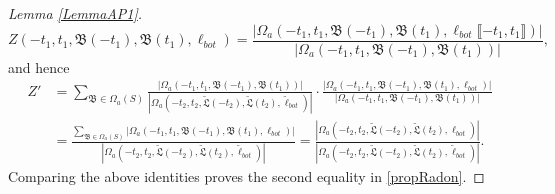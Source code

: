 \begin{proof}[Lemma \ref{LemmaAP1}]
\[	\]
	\[
	Z(-t_1,t_1,\mathfrak{B}(-t_1),\mathfrak{B}(t_1),\ell_{bot}) = \frac{|\Omega_a(-t_1,t_1,\mathfrak{B}(-t_1),\mathfrak{B}(t_1),\ell_{bot}\llbracket-t_1,t_1\rrbracket)|}{|\Omega_a(-t_1,t_1,\mathfrak{B}(-t_1),\mathfrak{B}(t_1))|},
	\]
	and hence
	\begin{equation*}
	\begin{split}
	Z' &=\sum_{\mathfrak{B}\in \Omega_a(S)}\frac{|\Omega_a(-t_1,t_1,\mathfrak{B}(-t_1),\mathfrak{B}(t_1))|}{|\Omega_a(-t_2,t_2,\tilde{\mathfrak{L}}(-t_2),\tilde{\mathfrak{L}}(t_2),\tilde\ell_{bot})|}\cdot\frac{|\Omega_a(-t_1,t_1,\mathfrak B(-t_1),\mathfrak{B}(t_1),\ell_{bot})|}{|\Omega_a(-t_1,t_1,\mathfrak{B}(-t_1),\mathfrak B(t_1))|}\\ 
	&= \frac{\sum_{\mathfrak{B}\in\Omega_a(S)}|\Omega_a(-t_1,t_1,\mathfrak B(-t_1),\mathfrak B(t_1),\ell_{bot})|}{|\Omega_a(-t_2,t_2,\tilde{\mathfrak L}(-t_2),\tilde{\mathfrak L}(t_2),\tilde{\ell}_{bot})|} = \frac{|\Omega_a(-t_2,t_2,\tilde{\mathfrak L}(-t_2),\tilde{\mathfrak L}(t_2),\ell_{bot})|}{|\Omega_a(-t_2,t_2,\tilde{\mathfrak L}(-t_2),\tilde{\mathfrak L}(t_2),\tilde{\ell}_{bot})|}.
	\end{split}
	\end{equation*}
	Comparing the above identities proves the second equality in \eqref{propRadon}.
	

\end{proof}

